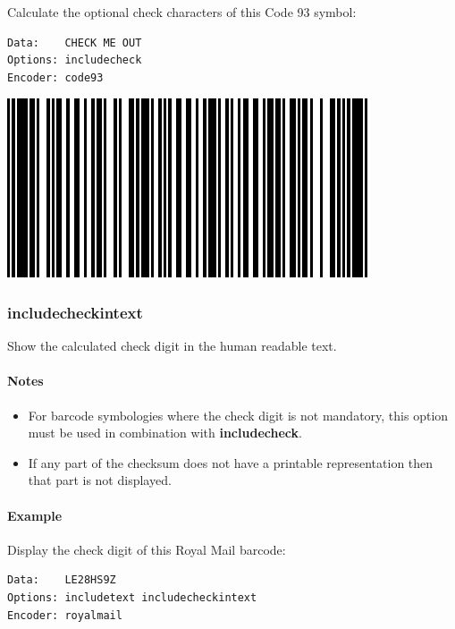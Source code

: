 Calculate the optional check characters of this Code 93 symbol:

\begin{verbatim}
Data:    CHECK ME OUT
Options: includecheck
Encoder: code93
\end{verbatim}

\includegraphics{images/optincludecheck.eps}

\hypertarget{includecheckintext}{%
\subsubsection{includecheckintext}\label{includecheckintext}}

Show the calculated check digit in the human readable text.

\hypertarget{notes}{%
\paragraph{Notes}\label{notes}}

\begin{itemize}
\tightlist
\item
  For barcode symbologies where the check digit is not mandatory, this
  option must be used in combination with \textbf{includecheck}.
\item
  If any part of the checksum does not have a printable representation
  then that part is not displayed.
\end{itemize}

\hypertarget{example-26}{%
\paragraph{Example}\label{example-26}}

Display the check digit of this Royal Mail barcode:

\begin{verbatim}
Data:    LE28HS9Z
Options: includetext includecheckintext
Encoder: royalmail
\end{verbatim}

